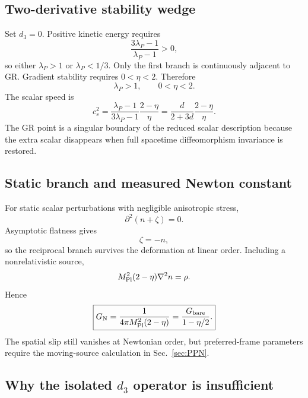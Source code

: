 \documentclass[11pt]{article}
\newcommand{\Mpl}{M_{\rm Pl}}
\newcommand{\GN}{G_{\rm N}}
\newcommand{\Gb}{G_{\rm bare}}
\newcommand{\cs}{c_s}
\begin{document}
\subsection{Two-derivative stability wedge}

Set $d_3=0$.  Positive kinetic energy requires
\begin{equation}
\frac{3\lambda_P-1}{\lambda_P-1}>0,
\end{equation}
so either $\lambda_P>1$ or $\lambda_P<1/3$.  Only the first branch is continuously adjacent to GR.  Gradient stability requires $0<\eta<2$.  Therefore
\begin{equation}
\boxed{\lambda_P>1,\qquad 0<\eta<2.}
\label{eq:wedge}
\end{equation}
The scalar speed is
\begin{equation}
\boxed{\cs^2=\frac{\lambda_P-1}{3\lambda_P-1}\frac{2-\eta}{\eta}
=\frac{d}{2+3d}\frac{2-\eta}{\eta}.}
\label{eq:cs}
\end{equation}
The GR point is a singular boundary of the reduced scalar description because the extra scalar disappears when full spacetime diffeomorphism invariance is restored.

\subsection{Static branch and measured Newton constant}

For static scalar perturbations with negligible anisotropic stress,
\begin{equation}
\partial^2(n+\zeta)=0.
\end{equation}
Asymptotic flatness gives
\begin{equation}
\zeta=-n,
\label{eq:recipdef}
\end{equation}
so the reciprocal branch survives the deformation at linear order.  Including a nonrelativistic source,
\begin{equation}
\Mpl^2(2-\eta)\nabla^2n=\rho.
\label{eq:PoissonDef}
\end{equation}
Hence
\begin{equation}
\boxed{\GN=\frac{1}{4\pi\Mpl^2(2-\eta)}
=\frac{\Gb}{1-\eta/2}.}
\label{eq:GN}
\end{equation}
The spatial slip still vanishes at Newtonian order, but preferred-frame parameters require the moving-source calculation in Sec.~\ref{sec:PPN}.

\subsection{Why the isolated $d_3$ operator is insufficient}
\end{document}
